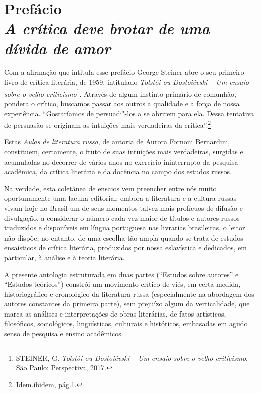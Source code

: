 \chapter*{Prefácio\\
\bigskip
\emph{A crítica deve brotar de uma dívida de amor}}




Com a afirmação que intitula esse prefácio George Steiner abre o seu primeiro livro de crítica
literária, de 1959, intitulado \emph{Tolstói ou Dostoiévski -- Um ensaio
sobre o velho criticismo}\footnote{STEINER, G. \emph{Tolstói ou
  Dostoiévski -- Um ensaio sobre o velho criticismo}, São Paulo:
  Perspectiva, 2017.}. Através de algum instinto primário de comunhão,
pondera o crítico, buscamos passar aos outros a qualidade e a força de
nossa experiência. ``Gostaríamos de persuadi"-los a se abrirem para ela.
Dessa tentativa de persuasão se originam as intuições mais verdadeiras
da crítica''.\footnote{Idem.ibidem, pág.1.}

Estas \emph{Aulas de literatura russa}, de autoria de Aurora Fornoni
Bernardini, constituem, certamente, o fruto de suas intuições mais
verdadeiras, surgidas e acumuladas no decorrer de vários anos no
exercício ininterrupto da pesquisa acadêmica, da crítica literária e da
docência no campo dos estudos russos.

Na verdade, esta coletânea de ensaios vem preencher entre nós muito
oportunamente uma lacuna editorial: embora a literatura e a cultura
russas vivam hoje no Brasil um de seus momentos talvez mais profícuos de
difusão e divulgação, a considerar o número cada vez maior de títulos e
autores russos traduzidos e disponíveis em língua portuguesa nas
livrarias brasileiras, o leitor não dispõe, no entanto, de uma escolha
tão ampla quando se trata de estudos ensaísticos de crítica literária,
produzidos por nossa eslavística e dedicados, em particular, à análise e
à teoria literária.

A presente antologia estruturada em duas partes (``Estudos sobre
autores'' e ``Estudos teóricos'') constrói um movimento crítico de viés,
em certa medida, historiográfico e cronológico da literatura russa
(especialmente na abordagem dos autores constantes da primeira parte),
sem prejuízo algum da verticalidade, que marca as análises e
interpretações de obras literárias, de fatos artísticos, filosóficos,
sociológicos, linguísticos, culturais e históricos, embasadas em agudo
senso de pesquisa e ensino acadêmicos.

